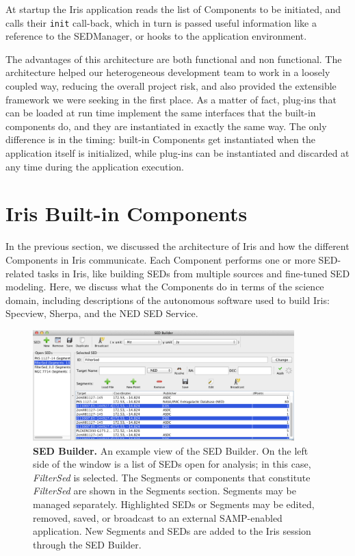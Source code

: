 \documentclass[preprint,authoryear,5p]{elsarticle}
\begin{document}
At startup the Iris application reads the list of Components to be initiated,
and calls their \texttt{init} call-back, which in turn is passed useful information
like a reference to the SEDManager, or hooks to the application environment.

The advantages of this architecture are both functional and non functional. The architecture
helped our heterogeneous development team to work in a loosely coupled way,
reducing the overall project risk, and also provided the extensible framework
we were seeking in the first place. As a matter of fact, plug-ins that can be
loaded at run time implement the same interfaces that the built-in components
do, and they are instantiated in exactly the same way. The only difference is in
the timing: built-in Components get instantiated when the application itself is
initialized, while plug-ins can be instantiated and discarded at any time during
the application execution.

\section{Iris Built-in Components} \label{sec:components} In the previous
section, we discussed the architecture of Iris and how the different Components
in Iris communicate. Each Component performs one or more SED-related tasks in
Iris, like building SEDs from multiple sources and fine-tuned SED modeling.
Here, we discuss what the Components do in terms of the science domain, including
descriptions of the autonomous software used to build
Iris: Specview, Sherpa, and the NED SED Service.

\begin{figure} \begin{center}
\includegraphics[width=0.9\textwidth]{sed_builder.pdf}
\caption{\textbf{SED Builder.}  An example view of the SED Builder. On
the left side of the window is a list of SEDs open for analysis; in this case,
\textit{FilterSed} is selected. The Segments or components that constitute
\textit{FilterSed} are shown in the Segments section. Segments may be managed
separately. Highlighted SEDs or Segments may be edited, removed, saved, or
broadcast to an external SAMP-enabled application. New Segments and SEDs are
added to the Iris session through the SED Builder. } \label{fig:sed_builder}
\end{center} \end{figure}
\end{document}
